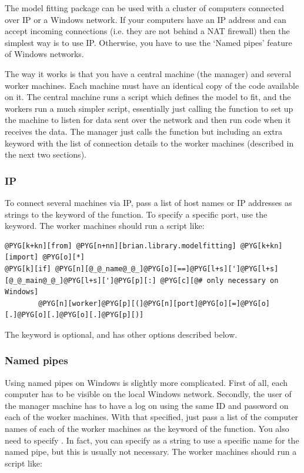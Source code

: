 \documentclass[letterpaper,10pt,english]{manual}
\begin{document}
The model fitting package can be used with a cluster of computers connected over
IP or a Windows network. If your computers have an IP address and can accept
incoming connections (i.e. they are not behind a NAT firewall) then the simplest
way is to use IP. Otherwise, you have to use the `Named pipes' feature of
Windows networks.

The way it works is that you have a central machine (the manager) and several
worker machines. Each machine must have an identical copy of the code available
on it. The central machine runs a script which defines the model to fit, and
the workers run a much simpler script, essentially just calling the
 function to set up the machine to listen for data
sent over the network and then run code when it receives the data. The manager
just calls the \hyperlink{brian.library.modelfitting.modelfitting}{} function but including an extra keyword
 with the list of connection details to the worker machines
(described in the next two sections).


\subsubsection{IP}

To connect several machines via IP, pass a list of host names or IP addresses
as strings to the  keyword of the \hyperlink{brian.library.modelfitting.modelfitting}{} function.
To specify a specific port, use the  keyword. The worker machines should
run a script like:

\begin{Verbatim}[commandchars=@\[\]]
@PYG[k+kn][from] @PYG[n+nn][brian.library.modelfitting] @PYG[k+kn][import] @PYG[o][*]
@PYG[k][if] @PYG[n][@_@_name@_@_]@PYG[o][==]@PYG[l+s][']@PYG[l+s][@_@_main@_@_]@PYG[l+s][']@PYG[p][:] @PYG[c][@# only necessary on Windows]
        @PYG[n][worker]@PYG[p][(]@PYG[n][port]@PYG[o][=]@PYG[o][.]@PYG[o][.]@PYG[o][.]@PYG[p][)]
\end{Verbatim}

The  keyword is optional, and  has other
options described below.


\subsubsection{Named pipes}

Using named pipes on Windows is slightly more complicated. First of all, each
computer has to be visible on the local Windows network. Secondly, the user of
the manager machine has to have a log on using the same ID and password on each
of the worker machines. With that specified, just pass a list of the computer
names of each of the worker machines as the  keyword of the
\hyperlink{brian.library.modelfitting.modelfitting}{} function. You also need to specify .
In fact, you can specify  as a string to use a specific name for
the named pipe, but this is usually not necessary. The worker machines should
run a script like:
\end{document}
